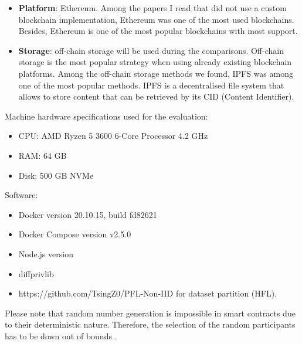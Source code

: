 
\begin{itemize}
    \item \textbf{Platform}: Ethereum. Among the papers I read that did not use a custom blockchain implementation, Ethereum was one of the most used blockchains. Besides, Ethereum is one of the most popular blockchains with most support.
    
    \item \textbf{Storage}: off-chain storage will be used during the comparisons. Off-chain storage is the most popular strategy when using already existing blockchain platforms. Among the off-chain storage methods we found, IPFS was among one of the most popular methods.  IPFS is a decentralised file system that allows to store content that can be retrieved by its CID (Content Identifier).
\end{itemize}


Machine hardware specifications used for the evaluation:

\begin{itemize}
    \item CPU: AMD Ryzen 5 3600 6-Core Processor 4.2 GHz
    \item RAM: 64 GB
    \item Disk: 500 GB NVMe
\end{itemize}

Software:

\begin{itemize}
    \item Docker version 20.10.15, build fd82621
    \item Docker Compose version v2.5.0
    \item Node.js version 
    \item diffprivlib \cite{diffprivlib}
    \item https://github.com/TsingZ0/PFL-Non-IID for dataset partition (HFL).
\end{itemize}
    
Please note that random number generation is impossible in smart contracts due to their deterministic nature. Therefore, the selection of the random participants has to be down out of bounds \cite{9293091}. 